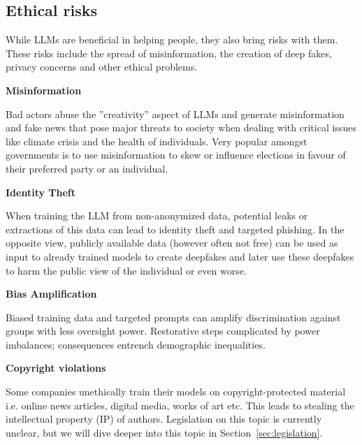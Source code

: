 \subsection{Ethical risks}
While LLMs are beneficial in helping people, they also bring risks with them. These risks include the spread of misinformation, the creation of deep fakes, privacy concerns and other ethical problems. 


\textbf{Misinformation}

Bad actors abuse the ''creativity'' aspect of LLMs and generate misinformation and fake news that pose major threats to society when dealing with critical issues like climate crisis and the health of individuals. Very popular amongst governments is to use misinformation to skew or influence elections in favour of their preferred party or an individual.

\textbf{Identity Theft}

When training the LLM from non-anonymized data, potential leaks or extractions of this data can lead to identity theft and targeted phishing.
In the opposite view, publicly available data (however often not free) can be used as input to already trained models to create deepfakes and later use these deepfakes to harm the public view of the individual or even worse.

\textbf{Bias Amplification}

Biased training data and targeted prompts can amplify discrimination against groups with less oversight power. 
Restorative steps complicated by power imbalances; consequences entrench demographic inequalities\cite{kumar2024ethicsinteractionmitigatingsecurity}. 


\textbf{Copyright violations}

Some companies unethically train their models on copyright-protected material i.e. online news articles, digital media, works of art etc. This leads to stealing the intellectual property (IP) of authors. Legislation on this topic is currently unclear, but we will dive deeper into this topic in Section~\ref{sec:legislation}.

